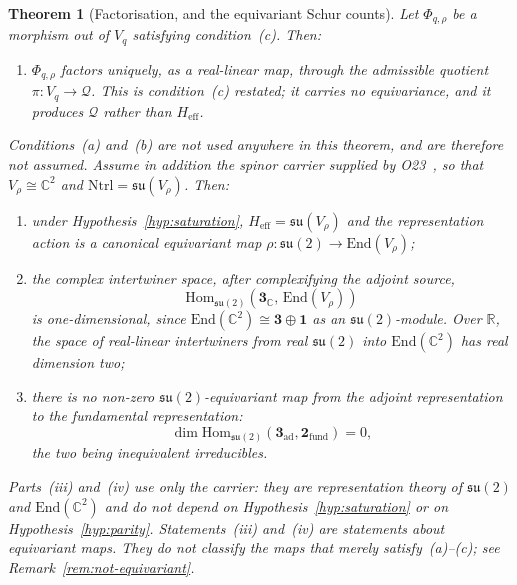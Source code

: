 \documentclass[11pt,a4paper]{article}
\newtheorem{theorem}{Theorem}[section]
\theoremstyle{remark}
\begin{document}
  \begin{theorem}[Factorisation, and the equivariant Schur counts]
    \label{thm:rigidity}
    Let $\Phi_{q,\rho}$ be a morphism out of $V_q$ satisfying condition~(c).  Then:
    \begin{enumerate}
      \item[(i)] $\Phi_{q,\rho}$ factors uniquely, as a real-linear map, through the admissible
      quotient $\pi \colon V_q \to \mathcal{Q}$.
      This is condition~(c) restated; it carries no equivariance, and it produces $\mathcal{Q}$
      rather than $H_{\mathrm{eff}}$.
    \end{enumerate}
    Conditions~(a) and~(b) are not used anywhere in this theorem, and are therefore not assumed.
    Assume in addition the spinor carrier supplied by O23~\cite{Beau2026a27}, so that
    $V_\rho \cong \mathbb{C}^2$ and $\mathrm{Ntrl} = \mathfrak{su}(V_\rho)$.  Then:
    \begin{enumerate}
      \item[(ii)] under Hypothesis~\ref{hyp:saturation}, $H_{\mathrm{eff}} =
      \mathfrak{su}(V_\rho)$ and the representation action is a canonical equivariant map
      $\rho \colon \mathfrak{su}(2) \to \mathrm{End}(V_\rho)$;
      \item[(iii)] the complex intertwiner space, after complexifying the adjoint source,
      \[
        \mathrm{Hom}_{\mathfrak{su}(2)}(\mathbf{3}_{\mathbb{C}},\, \mathrm{End}(V_\rho))
      \]
      is one-dimensional, since
      $\mathrm{End}(\mathbb{C}^2) \cong \mathbf{3} \oplus \mathbf{1}$ as an
      $\mathfrak{su}(2)$-module.
      Over $\mathbb{R}$, the space of real-linear intertwiners from real $\mathfrak{su}(2)$ into
      $\mathrm{End}(\mathbb{C}^2)$ has real dimension two;
      \item[(iv)] there is no non-zero $\mathfrak{su}(2)$-equivariant map from the adjoint
      representation to the fundamental representation:
      \[
        \dim \mathrm{Hom}_{\mathfrak{su}(2)}(\mathbf{3}_{\mathrm{ad}},
        \mathbf{2}_{\mathrm{fund}}) = 0 ,
      \]
      the two being inequivalent irreducibles.
    \end{enumerate}
    Parts~(iii) and~(iv) use only the carrier: they are representation theory of
    $\mathfrak{su}(2)$ and $\mathrm{End}(\mathbb{C}^2)$ and do not depend on
    Hypothesis~\ref{hyp:saturation} or on Hypothesis~\ref{hyp:parity}.
    Statements~(iii) and~(iv) are statements about \emph{equivariant} maps.  They do not classify
    the maps that merely satisfy~(a)--(c); see Remark~\ref{rem:not-equivariant}.
  \end{theorem}
\end{document}
